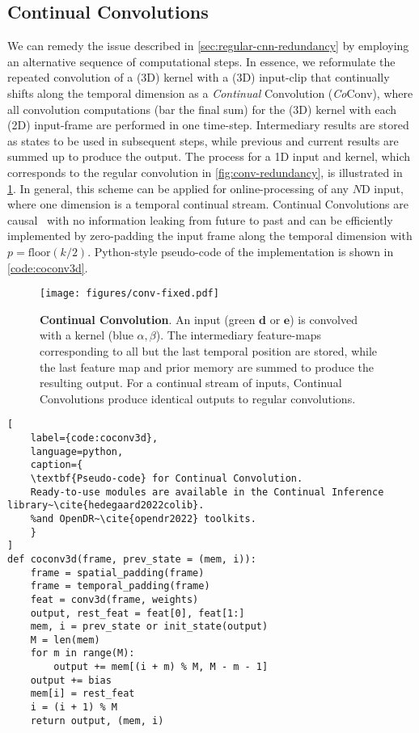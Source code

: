 \vspace{-3mm}
\subsection{Continual Convolutions}
\vspace{-1mm}
We can remedy the issue described in \cref{sec:regular-cnn-redundancy} by employing an alternative sequence of computational steps. 
In essence, we reformulate the repeated convolution of a (3D) kernel with a (3D) input-clip that continually shifts along the temporal dimension as a \textit{Continual} Convolution (\textit{Co}Conv), where all convolution computations (bar the final sum) for the (3D) kernel with each (2D) input-frame are performed in one time-step. 
Intermediary results are stored as states to be used in subsequent steps, while previous and current results are summed up to produce the output. 
The process for a 1D input and kernel, which corresponds to the regular convolution in \cref{fig:conv-redundancy}, is illustrated in \cref{fig:conv-fixed}. 
%
In general, this scheme can be applied for online-processing of any $N$D input, where one dimension is a temporal continual stream.
Continual Convolutions are causal~\cite{oord2016wavenet} with no information leaking from future to past 
and can be efficiently implemented by zero-padding the input frame along the temporal dimension with $p = \text{floor}(k / 2)$. 
Python-style pseudo-code of the implementation is shown in \cref{code:coconv3d}.
%
\begin{figure}
    \centering
    \texttt{[image: figures/conv-fixed.pdf]}
	\caption{
	\textbf{Continual Convolution}. 
	An input (green $\mathbf{d}$ or $\mathbf{e}$) is convolved with a kernel (blue $\alpha, \beta$). The intermediary feature-maps corresponding to all but the last temporal position are stored, while the last feature map and prior memory are summed to produce the resulting output. For a continual stream of inputs, Continual Convolutions produce identical outputs to regular convolutions.
	}
    \label{fig:conv-fixed}
    \vspace{-5mm}
\end{figure}
%
\begin{center}
\noindent\begin{minipage}{0.8\columnwidth}
\begin{lstlisting}[
    label={code:coconv3d},
    language=python,
    caption={
    \textbf{Pseudo-code} for Continual Convolution.
    Ready-to-use modules are available in the Continual Inference library~\cite{hedegaard2022colib}.
    %and OpenDR~\cite{opendr2022} toolkits.
    }
]
def coconv3d(frame, prev_state = (mem, i)):
    frame = spatial_padding(frame)
    frame = temporal_padding(frame)
    feat = conv3d(frame, weights) 
    output, rest_feat = feat[0], feat[1:]
    mem, i = prev_state or init_state(output)
    M = len(mem)
    for m in range(M):
        output += mem[(i + m) % M, M - m - 1]
    output += bias
    mem[i] = rest_feat
    i = (i + 1) % M
    return output, (mem, i)
\end{lstlisting}
\end{minipage}
\end{center}

